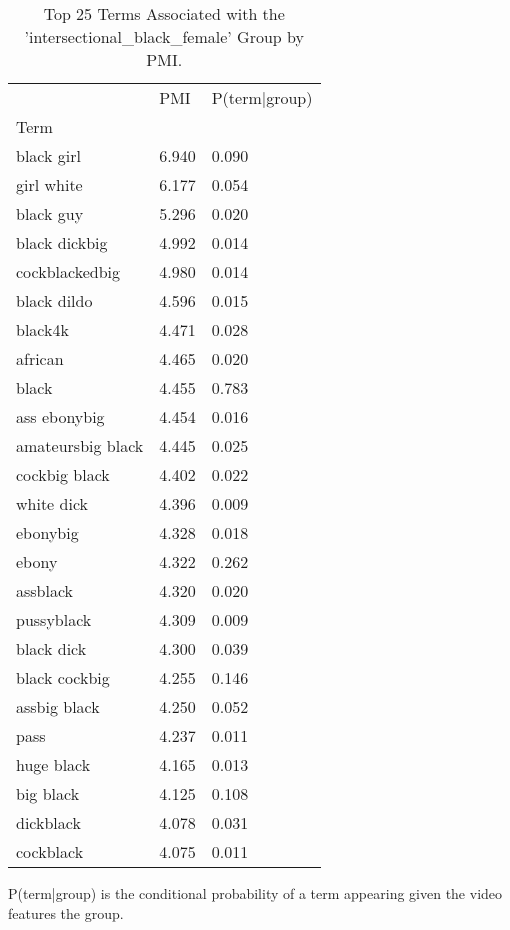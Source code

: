 \begin{table}[htbp]
\centering
\caption{Top 25 Terms Associated with the 'intersectional_black_female' Group by PMI.}
\label{tab:pmi-black-women}
\begin{tabular}{lll}
\toprule
 & PMI & P(term|group) \\
Term &  &  \\
\midrule
black girl & 6.940 & 0.090 \\
girl white & 6.177 & 0.054 \\
black guy & 5.296 & 0.020 \\
black dickbig & 4.992 & 0.014 \\
cockblackedbig & 4.980 & 0.014 \\
black dildo & 4.596 & 0.015 \\
black4k & 4.471 & 0.028 \\
african & 4.465 & 0.020 \\
black & 4.455 & 0.783 \\
ass ebonybig & 4.454 & 0.016 \\
amateursbig black & 4.445 & 0.025 \\
cockbig black & 4.402 & 0.022 \\
white dick & 4.396 & 0.009 \\
ebonybig & 4.328 & 0.018 \\
ebony & 4.322 & 0.262 \\
assblack & 4.320 & 0.020 \\
pussyblack & 4.309 & 0.009 \\
black dick & 4.300 & 0.039 \\
black cockbig & 4.255 & 0.146 \\
assbig black & 4.250 & 0.052 \\
pass & 4.237 & 0.011 \\
huge black & 4.165 & 0.013 \\
big black & 4.125 & 0.108 \\
dickblack & 4.078 & 0.031 \\
cockblack & 4.075 & 0.011 \\
\bottomrule
\end{tabular}

\begin{tablenotes}[flushleft]
\item \small{P(term|group) is the conditional probability of a term appearing given the video features the group.}
\end{tablenotes}
\end{table}